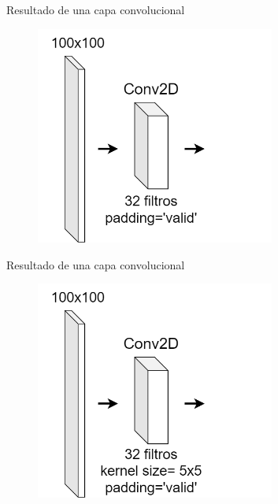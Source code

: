 \begin{frame}{Resultado de una capa convolucional}
\begin{figure}
    \centering
    \includegraphics[width=0.7\textwidth]{figures/Tema 3/ConvDimensions_3.png}
\end{figure}
\end{frame}

\begin{frame}{Resultado de una capa convolucional}
\begin{figure}
    \centering
    \includegraphics[width=0.7\textwidth]{figures/Tema 3/ConvDimensions_4.png}
\end{figure}
\end{frame}

